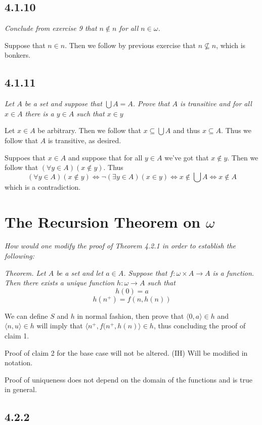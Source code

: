 \documentclass[11pt,oneside,titlepage]{book}
\DeclareMathOperator \lra {\Leftrightarrow}
\newcommand{\eangle}[1]{\langle #1 \rangle}
\begin{document}
\subsection*{4.1.10}

\textit{Conclude from exercise 9 that $n \notin n$ for all $n \in \omega$.}

Suppose that $n \in n$. Then we follow by previous exercise
that $n \not \subseteq n$, which is bonkers.

\subsection*{4.1.11}

\textit{Let $A$ be a set and suppose that $\bigcup A = A$. Prove that $A$ is transitive
  and for all $x \in A$ there is a $y \in A$ such that $x \in y$}

Let $x \in A$ be arbitrary.
Then we follow that $x \subseteq \bigcup A$ and thus $x \subseteq A$. Thus we follow that
$A$ is transitive, as desired.

Suppoes that $x \in A$ and suppose that for all $y \in A$ we've got that $x \notin y$.
Then we follow that $(\forall y \in A)(x \notin y)$. Thus
$$(\forall y \in A)(x \notin y) \lra \neg (\exists y \in A)(x \in y) \lra x \notin \bigcup A \lra
x \notin A$$
which is a contradiction.

\section{The Recursion Theorem on $\omega$}

\textit{How would one modify the proof of Theorem 4.2.1 in order to establish the
  following: }

\textit{Theorem. Let $A$ be a set and let $a \in A$. Suppose that $f: \omega \times A \to A$
  is a function. Then there exists a unique function $h: \omega \to A$ such that
  $$h(0) = a$$
  $$h(n^+) = f(n, h(n))$$}

We can define $S$ and $h$ in normal fashion, then prove that $\eangle{0, a} \in h$ and
$\eangle{n, u} \in h$ will imply that $\eangle{n^+, f(n^+, h(n)} \in h$, thus concluding the
proof of claim 1.

Proof of claim 2 for the base case will not be altered. (IH) Will be modified in notation.


Proof of uniqueness does not depend on the domain of the functions and is true in general.

\subsection*{4.2.2}
\end{document}
